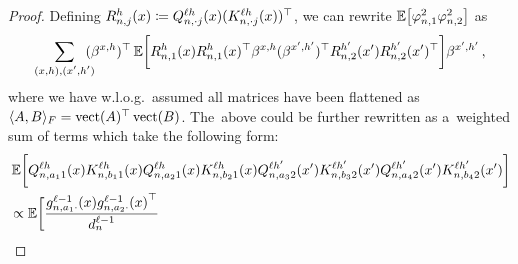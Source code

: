 \begin{proof}
    Defining $R_{n, j}^{h}(x) \coloneqq Q_{n, \cdot j}^{\ell h}(x) (K_{n, \cdot j}^{\ell h}(x))^\top$, we can rewrite
    $\operatorname*{\mathbb{E}} \bigl[ \varphi_{n , 1}^2 \varphi_{n , 2}^2  \bigr]$ as
    \begin{align*}
        \sum_{\substack{(x, h) , (x', h')}}
        \!\!\!\!
            (\beta^{x, h})^\top
            \operatorname*{\mathbb{E}} \biggl[
                R_{n, 1}^{h}(x)
                R_{n, 1}^{h}(x)^\top
                \beta^{x, h}
                (\beta^{x', h'})^\top
                R_{n, 2}^{h'}(x')
                R_{n, 2}^{h'}(x')^\top
            \biggr]
            \beta^{x', h'}
        \, ,
    \end{align*}
    where we have w.l.o.g.\ assumed all matrices have been flattened as $\langle A , B \rangle_F = \operatorname{vect}(A)^\top \operatorname{vect}(B)$.
    The~above could be further rewritten as a~weighted sum of terms which take the following form:
    \begin{align*}
        &\E \biggl[
            \query{\sequenceVariable, a_1 1}{\depthSymbol \headIndex}(\inputSymbol)
            \key{\sequenceVariable, b_1 1}{\depthSymbol \headIndex}(\inputSymbol)
            \query{\sequenceVariable, a_2 1}{\depthSymbol \headIndex}(\inputSymbol)
            \key{\sequenceVariable, b_2 1}{\depthSymbol \headIndex}(\inputSymbol)
            \query{\sequenceVariable, a_3 2}{\depthSymbol \headIndex'}(\inputSymbol')
            \key{\sequenceVariable, b_3 2}{\depthSymbol \headIndex'}(\inputSymbol')
            \query{\sequenceVariable, a_4 2}{\depthSymbol \headIndex'}(\inputSymbol')
            \key{\sequenceVariable, b_4 2}{\depthSymbol \headIndex'}(\inputSymbol')
        \biggr]
        \\
        &\propto
        \E \biggl[
            \frac{
                \indexedActivity{\depthSymbol - 1}{\sequenceVariable, a_1 \cdot}{\inputSymbol}
                \indexedActivity{\depthSymbol - 1}{\sequenceVariable, a_2 \cdot}{\inputSymbol}^\top
            }{\layerDimension{\depthSymbol - 1}}

\end{align*}
\end{proof}
